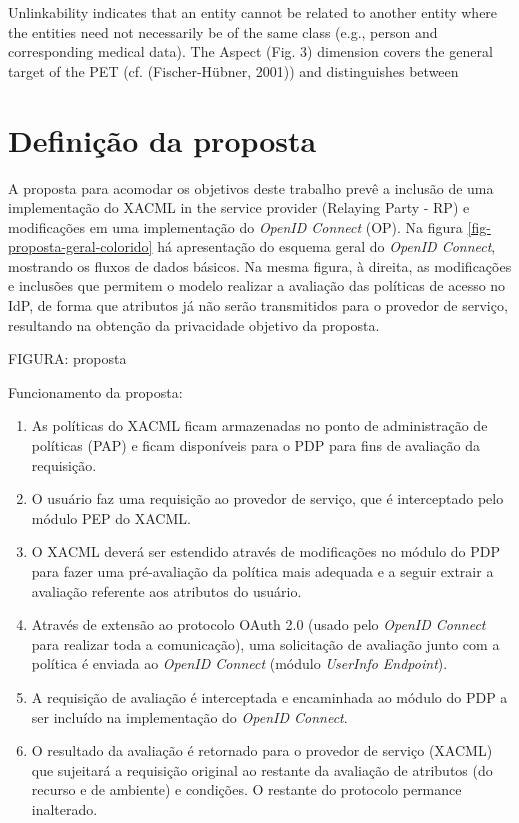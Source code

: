 \documentclass{doublecol-new}
\begin{document}
Unlinkability indicates that an entity cannot be related to
another entity where the entities need not necessarily be of
the same class (e.g., person and corresponding medical data).
The Aspect (Fig. 3) dimension covers the general target of the
PET (cf. (Fischer-Hübner, 2001)) and distinguishes between




\section{Definição da proposta}

A proposta para acomodar os objetivos deste trabalho prevê a inclusão de uma implementação do XACML in the service provider (Relaying Party - RP) e modificações em uma implementação do \textit{OpenID Connect} (OP). Na figura \ref{fig-proposta-geral-colorido} há apresentação do esquema geral do \textit{OpenID Connect}, mostrando os fluxos de dados básicos. Na mesma figura, à direita, as modificações e inclusões que permitem o modelo realizar a avaliação das políticas de acesso no IdP, de forma que atributos já não serão transmitidos para o provedor de serviço, resultando na obtenção da privacidade objetivo da proposta. 

FIGURA: proposta

Funcionamento da proposta: 
\begin{enumerate}
	\item As políticas do XACML ficam armazenadas no ponto de administração de políticas (PAP) e ficam disponíveis para o PDP para fins de avaliação da requisição.
	\item O usuário faz uma requisição ao provedor de serviço, que é interceptado pelo módulo PEP do XACML.
	\item O XACML deverá ser estendido através de modificações no módulo do PDP para fazer uma pré-avaliação da política mais adequada e a seguir extrair a avaliação referente aos atributos do usuário.
	\item Através de extensão ao protocolo OAuth 2.0 (usado pelo \textit{OpenID Connect} para realizar toda a comunicação), uma solicitação de avaliação junto com a política é enviada ao \textit{OpenID Connect} (módulo \textit{UserInfo Endpoint}).
	\item A requisição de avaliação é interceptada e encaminhada ao módulo do PDP a ser incluído na implementação do \textit{OpenID Connect}.
	\item O resultado da avaliação é retornado para o provedor de serviço (XACML) que sujeitará a requisição original ao restante da avaliação de atributos (do recurso e de ambiente) e condições. O restante do protocolo permance inalterado.
\end{enumerate}   
\end{document}
